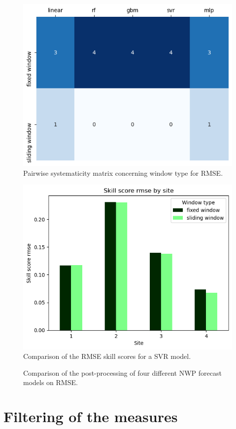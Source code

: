\begin{figure}[htb!]
    \centering
    \includegraphics[width=\columnwidth]{figures/first_study/comp_window_rmse.png}
\caption{Pairwise systematicity matrix concerning window type for RMSE.}
\end{figure}

\begin{figure}[htb!]
    \centering
    \includegraphics[width=\columnwidth]{figures/first_study/comp_window_rmse_mlp.png}
\caption{Comparison of the RMSE skill scores for a SVR model.}
\end{figure}

\begin{figure}[htb!]
    \centering
    
\caption{Comparison of the post-processing of four different NWP forecast models on RMSE.}
\end{figure}

\section{Filtering of the measures}\label{sec:filtering}